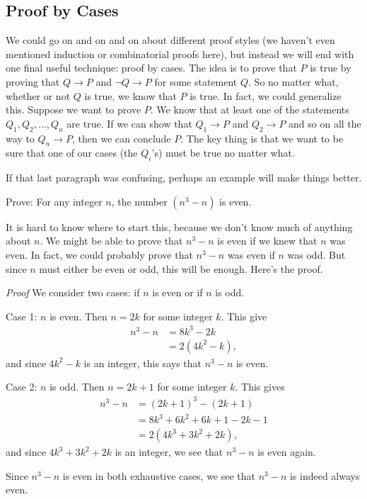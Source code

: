 \documentclass[11pt,]{book}
\makeatletter
\theoremstyle{ptxplainnotitle}
\theoremstyle{ptxplaintitle}
\renewcommand*{\proofname}{Proof}
\renewenvironment{proof}[1][\proofname]{\par
  \pushQED{\qed}%
  \normalfont \topsep6\p@\@plus6\p@\relax
  \trivlist
  \item\relax
    {\itshape
    #1\@addpunct{.}}\hspace\labelsep\ignorespaces
}{%
  \popQED\endtrivlist\@endpefalse
}
\theoremstyle{ptxdefinitionnotitle}
\theoremstyle{ptxdefinitiontitle}
\theoremstyle{ptxdefinitionnotitle}
\theoremstyle{ptxdefinitiontitle}
\theoremstyle{ptxdefinitionnotitle}
\theoremstyle{ptxdefinitiontitle}
\theoremstyle{ptxdefinitiontitlenonumber}
\theoremstyle{ptxdefinitiontitlenonumber}
\numberwithin{equation}{chapter}
\newcommand{\imp}{\rightarrow}
\newcommand{\amp}{&}
\makeatother
\begin{document}
\subsection[{Proof by Cases}]{Proof by Cases}\label{subsection-26}
\hypertarget{p-2358}{}%
%
\par
\hypertarget{p-2359}{}%
We could go on and on and on about different proof styles (we haven't even mentioned induction or combinatorial proofs here), but instead we will end with one final useful technique: proof by cases. The idea is to prove that \(P\) is true by proving that \(Q \imp P\) and \(\neg Q \imp P\) for some statement \(Q\). So no matter what, whether or not \(Q\) is true, we know that \(P\) is true. In fact, we could generalize this. Suppose we want to prove \(P\). We know that at least one of the statements \(Q_1, Q_2, \ldots, Q_n\) are true. If we can show that \(Q_1 \imp P\) and \(Q_2 \imp P\) and so on all the way to \(Q_n \imp P\), then we can conclude \(P\). The key thing is that we want to be sure that one of our cases (the \(Q_i\)'s) must be true no matter what.%
\par
\hypertarget{p-2360}{}%
If that last paragraph was confusing, perhaps an example will make things better.%
\begin{example}\label{example-72}
\hypertarget{p-2361}{}%
Prove: For any integer \(n\), the number \((n^3 -n)\) is even.%
\par\smallskip%
\noindent\textbf{}\hypertarget{solution-259}{}\hypertarget{p-2362}{}%
It is hard to know where to start this, because we don't know much of anything about \(n\). We might be able to prove that \(n^3 - n\) is even if we knew that \(n\) was even. In fact, we could probably prove that \(n^3-n\) was even if \(n\) was odd. But since \(n\) must either be even or odd, this will be enough. Here's the proof.%
\begin{proof}\hypertarget{proof-30}{}
\hypertarget{p-2363}{}%
We consider two cases: if \(n\) is even or if \(n\) is odd.%
\par
\hypertarget{p-2364}{}%
Case 1: \(n\) is even. Then \(n = 2k\) for some integer \(k\). This give%
\begin{align*}
n^3 - n \amp = 8k^3 - 2k\\
\amp = 2(4k^2 - k),
\end{align*}
and since \(4k^2 - k\) is an integer, this says that \(n^3-n\) is even.%
\par
\hypertarget{p-2365}{}%
Case 2: \(n\) is odd. Then \(n = 2k+1\) for some integer \(k\). This gives%
\begin{align*}
n^3 - n \amp = (2k+1)^3 - (2k+1)\\
\amp = 8k^3 + 6k^2 + 6k + 1 - 2k - 1\\
\amp = 2(4k^3 + 3k^2 + 2k),
\end{align*}
and since \(4k^3 + 3k^2 + 2k\) is an integer, we see that \(n^3 - n\) is even again.%
\par
\hypertarget{p-2366}{}%
Since \(n^3 - n\) is even in both exhaustive cases, we see that \(n^3 - n\) is indeed always even.%
\end{proof}
\end{example}
\end{document}
